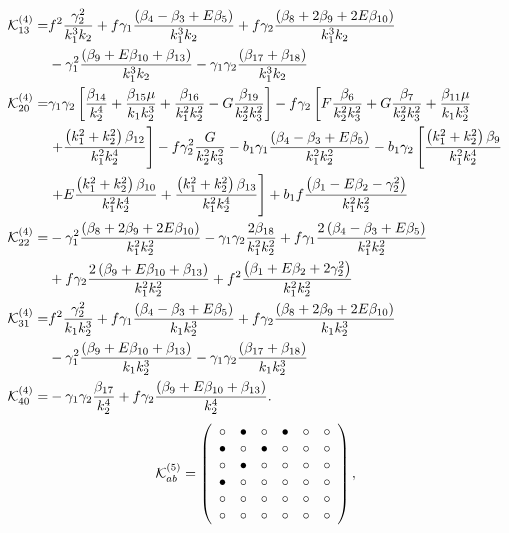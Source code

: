\begin{align*}
\mathcal{K}_{13}^{(4)}=& f^2 \frac{\gamma_2^2}{k_1^3 k_2} + f \gamma_1 \frac{\left( {\beta_{4}-\beta_{3}} + E \beta_{5} \right)}{k_1^3 k_2} + f \gamma_2 \frac{\left( \beta_{8} + 2 \beta_{9} + 2 E \beta_{10} \right)}{k_1^3 k_2} \\
&- \gamma_1^2 \frac{\left( \beta_{9} + E \beta_{10} + \beta_{13} \right)}{k_1^3 k_2} - \gamma_1 \gamma_2 \frac{\left( \beta_{17} + \beta_{18} \right)}{k_1^3 k_2} \\
\mathcal{K}_{20}^{(4)}=& \gamma_1 \gamma_2 \left[ \frac{\beta_{14}}{k_2^4} + \frac{\beta_{15} \mu }{k_1 k_2^3} + \frac{\beta_{16}}{k_1^2 k_2^2} - G \frac{\beta_{19}}{k_2^2 k_3^2} \right] - f \gamma_2 \left[ F \frac{\beta_{6}}{k_2^2 k_3^2} + G \frac{\beta_{7}}{k_2^2 k_3^2} + \frac{\beta_{11} \mu}{k_1 k_2^3} \right. \\
&\left. + \frac{\left( k_1^2 + k_2^2 \right) \beta_{12}}{k_1^2 k_2^4} \right] - f \gamma_2^2 \frac{G}{k_2^2 k_3^2} - b_1 \gamma_1 \frac{\left( {\beta_{4}-\beta_{3}} + E \beta_{5} \right)}{k_1^2 k_2^2} - b_1 \gamma_2 \left[ \frac{\left( k_1^2 + k_2^2 \right) \beta_{9}}{k_1^2 k_2^4} \right. \\
&\left. + E \frac{\left( k_1^2 + k_2^2 \right) \beta_{10} }{k_1^2 k_2^4} + \frac{\left( k_1^2 + k_2^2 \right) \beta_{13}}{k_1^2 k_2^4} \right] + b_1 f \frac{\left( \beta_1 - E \beta_2 - \gamma_2^2 \right)}{k_1^2 k_2^2} \\
\mathcal{K}_{22}^{(4)}=& - \gamma_1^2 \frac{\left( \beta_{8} + 2 \beta_{9} + 2 E \beta_{10} \right)}{k_1^2 k_2^2} - \gamma_1 \gamma_2 \frac{2 \beta_{18}}{k_1^2 k_2^2}+  f \gamma_1 \frac{2\left( {\beta_{4}-\beta_{3}} + E \beta_{5} \right)}{k_1^2 k_2^2} \\
& + f \gamma_2 \frac{2 \left( \beta_{9} + E \beta_{10} + \beta_{13} \right)}{k_1^2 k_2^2} + f^2 \frac{\left( \beta_1 + E \beta_2 + 2 \gamma_2^2 \right)}{k_1^2 k_2^2} \\
\mathcal{K}_{31}^{(4)}=& f^2 \frac{\gamma_2^2}{k_1 k_2^3} + f \gamma_1 \frac{\left( {\beta_{4}-\beta_{3}} + E \beta_{5}\right)}{k_1 k_2^3} + f \gamma_2 \frac{\left( \beta_{8} + 2 \beta_{9} + 2 E \beta_{10}  \right)}{k_1 k_2^3} \\
& - \gamma_1^2 \frac{\left( \beta_{9} + E \beta_{10} + \beta_{13} \right)}{k_1 k_2^3} - \gamma_1 \gamma_2 \frac{\left( \beta_{17} + \beta_{18} \right)}{k_1 k_2^3} \\
\mathcal{K}_{40}^{(4)}=&  - \gamma_1 \gamma_2 \frac{\beta_{17}}{k_2^4} + f \gamma_2 \frac{\left( \beta_{9} + E \beta_{10} + \beta_{13} \right)}{k_2^4}  .
\end{align*}
\begin{equation}
	\mathcal{K}^{(5)}_{ab}= 
 \left( \begin {array}{cccccc} \circ &\bullet &\circ &\bullet 
&\circ &\circ \\  \bullet &\circ &\bullet &
\circ &\circ &\circ \\  \circ &\bullet &
\circ &\circ &\circ &\circ \\  \bullet &
\circ &\circ &\circ &\circ &\circ \\  
\circ &\circ &\circ &\circ &\circ &\circ 
\\  \circ &\circ &\circ &\circ &\circ &
\circ \end {array} \right), 
\end{equation}

